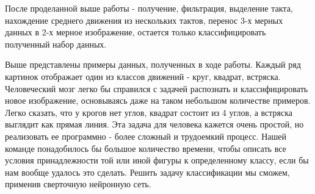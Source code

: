 После проделанной выше работы - получение, фильтрация, выделение такта, нахождение среднего движения из нескольких тактов, перенос 3-х мерных данных в 2-х мерное изображение, остается только классифицировать полученный набор данных. 
\begin{figure}[H]
\end{figure}
Выше представлены примеры данных, полученных в ходе работы. Каждый ряд картинок отображает один из классов движений - круг, квадрат, встряска. Человеческий мозг легко бы справился с задачей распознать и классифицировать новое изображение, основываясь даже на таком небольшом количестве примеров. Легко сказать, что у крогов нет углов, квадрат состоит из 4 углов, а встряска выглядит как прямая линия. Эта задача для человека кажется очень простой, но реализовать ее программно - более сложный и трудоемкий процесс. Нашей команде понадобилось бы большое количество времени, чтобы описать все условия принадлежности той или иной фигуры к определенному классу, если бы нам вообще удалось это сделать. Решить задачу классификации мы сможем, применив сверточную нейронную сеть.
